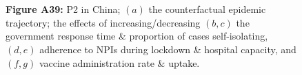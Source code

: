 \documentclass[paper=a4,fontsize=11pt]{article}
\begin{document}
\begin{figure}[!h]
  \\
  \hspace{1.76cm}
  \\
  \caption*{\textbf{Figure A39:} P2 in China; $(a)$ the counterfactual epidemic trajectory; the effects of increasing/decreasing $(b,c)$ the government response time \& proportion of cases self-isolating, $(d,e)$ adherence to NPIs during lockdown \& hospital capacity, and $(f,g)$ vaccine administration rate \& uptake.}
\end{figure}
\end{document}

